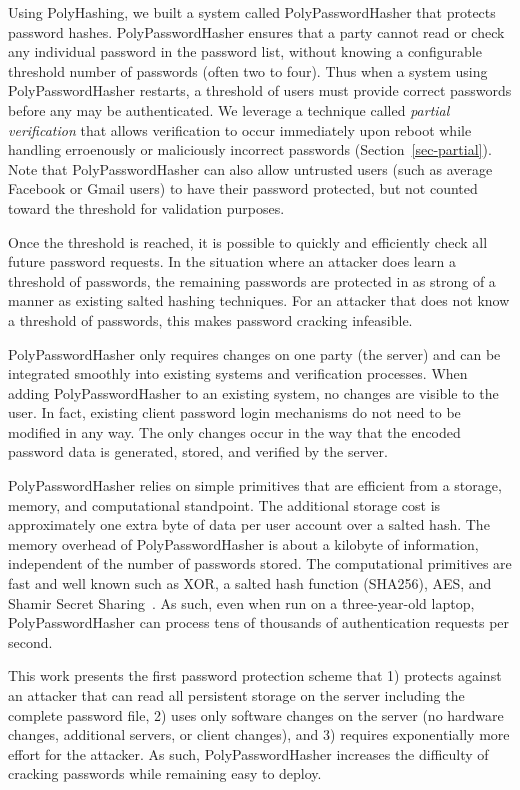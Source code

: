 Using PolyHashing, we built a system called PolyPasswordHasher that 
protects password hashes.  PolyPasswordHasher ensures that a party cannot 
read or check any individual password in the password list, without knowing
a configurable threshold number of passwords (often two to four).   Thus when 
a system using PolyPasswordHasher restarts, a threshold of users must provide correct
passwords before any may be authenticated.   We leverage a technique called
\emph{partial verification} that allows verification to occur immediately
upon reboot while handling erroenously or maliciously incorrect passwords
(Section~\ref{sec-partial}).
Note that PolyPasswordHasher can also allow untrusted users (such as 
average Facebook or Gmail users) to have their password protected, but not 
counted toward the threshold for validation purposes.

Once the threshold is 
reached, it is possible to quickly and efficiently check all future password
requests.  
In the situation where an attacker does learn a threshold of passwords, the 
remaining passwords are 
protected in as strong of a manner as existing salted hashing 
techniques.  For an attacker that does not know a threshold of passwords, 
this makes password cracking infeasible.

PolyPasswordHasher only requires changes on one party (the server) and can be 
integrated smoothly into existing systems and verification processes.  %
When adding PolyPasswordHasher to an existing system, no changes are visible to 
the user.  In fact, existing
client password login mechanisms do not need to be modified in any way.   The
only changes occur in the way that the encoded password data is generated,
stored, and verified by the server.


PolyPasswordHasher relies on simple primitives that are efficient from a storage, 
memory, and computational standpoint.   The additional storage cost is 
approximately one extra byte of data per user account over a salted 
hash.   The memory overhead of PolyPasswordHasher is about a kilobyte of 
information, independent of the number of passwords stored.
The computational primitives are fast and well known
such as XOR, a salted hash function (SHA256), AES, and Shamir Secret 
Sharing~\cite{shamir1979share}.
As such, even when run on a three-year-old laptop, PolyPasswordHasher can 
process tens of thousands of authentication requests per second.


This work presents the first password protection scheme that 1) protects 
against an attacker that can read all persistent storage on the server
including the complete password file, 
2) uses only software changes on the server (no hardware changes, 
additional servers, or client changes), and 3) requires exponentially more 
effort for the attacker.   
As such, PolyPasswordHasher increases the difficulty
of cracking passwords while remaining easy to deploy.

